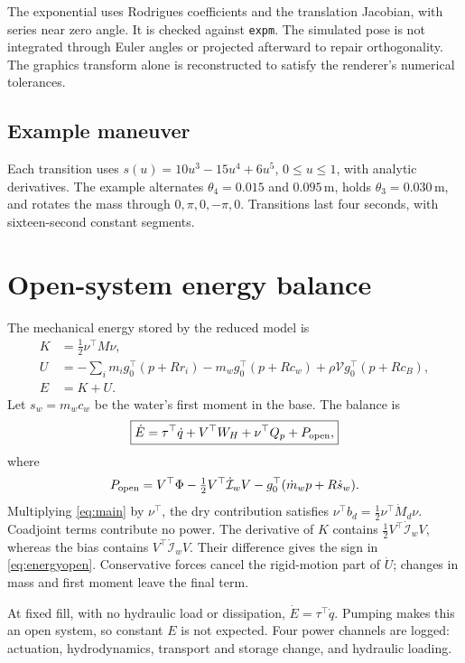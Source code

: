 \documentclass[11pt,a4paper]{article}
\begin{document}
The exponential uses Rodrigues coefficients and the translation
Jacobian, with series near zero angle. It is checked against
\texttt{expm}. The simulated pose is not integrated through Euler angles
or projected afterward to repair orthogonality. The graphics transform
alone is reconstructed to satisfy the renderer's numerical tolerances.

\subsection{Example maneuver}
Each transition uses \(s(u)=10u^3-15u^4+6u^5\), \(0\leq u\leq1\), with
analytic derivatives. The example alternates \(\theta_4=0.015\) and
\(0.095\,\mathrm m\), holds \(\theta_3=0.030\,\mathrm m\), and rotates
the mass through \(0,\pi,0,-\pi,0\). Transitions last four seconds,
with sixteen-second constant segments.
\clearpage

\section{Open-system energy balance}
The mechanical energy stored by the reduced model is
\begin{align}
K&=\tfrac12\nu^\top M\nu,\\
U&=-\sum_i m_ig_0^\top(p+Rr_i)-m_wg_0^\top(p+Rc_w)
+\rho\mathcal V g_0^\top(p+Rc_B),\\
E&=K+U.
\end{align}
Let \(s_w=m_wc_w\) be the water's first moment in the base. The balance is
\begin{equation}
\boxed{\dot E=\tau^\top\dot q+V^\top W_H+\nu^\top Q_p+P_{\rm open},}
\end{equation}
where
\begin{equation}
P_{\rm open}=V^\top\Phi-\tfrac12V^\top\dot{\mathcal I}_wV
-g_0^\top(\dot m_wp+R\dot s_w).\label{eq:energyopen}
\end{equation}
Multiplying \eqref{eq:main} by \(\nu^\top\), the dry contribution satisfies
\(\nu^\top b_d=\frac12\nu^\top\dot M_d\nu\). Coadjoint terms contribute
no power. The derivative of \(K\) contains
\(\frac12V^\top\dot{\mathcal I}_wV\), whereas the bias contains
\(V^\top\dot{\mathcal I}_wV\). Their difference gives the sign in
\eqref{eq:energyopen}. Conservative forces cancel the rigid-motion part
of \(\dot U\); changes in mass and first moment leave the final term.

At fixed fill, with no hydraulic load or dissipation,
\(\dot E=\tau^\top\dot q\). Pumping makes this an open system, so constant
\(E\) is not expected. Four power channels are logged: actuation,
hydrodynamics, transport and storage change, and hydraulic loading.
\end{document}
